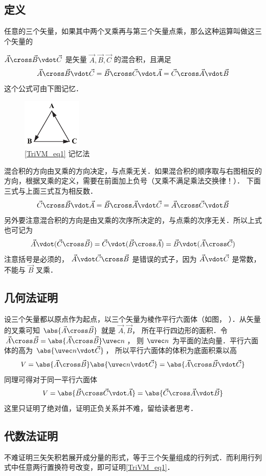 
\subsection{定义}

任意的三个矢量，如果其中两个叉乘再与第三个矢量点乘，那么这种运算叫做这三个矢量的

$\vec A \cross \vec B \vdot \vec C$ 是矢量 $\vec A, \vec B, \vec C$ 的混合积，且满足
\begin{equation}\label{TriVM_eq1}
\vec A \cross \vec B \vdot \vec C = \vec B \cross \vec C \vdot \vec A = \vec C \cross \vec A \vdot \vec B 
\end{equation} 
这个公式可由下图记忆．
\begin{figure}[ht]
\centering
\includegraphics[width=0.25\textwidth]{./figures/TriVM.pdf}
\caption{\autoref{TriVM_eq1} 记忆法}
\end{figure}
混合积的方向由叉乘的方向决定，与点乘无关．如果混合积的顺序取与右图相反的方向，根据叉乘的定义，需要在前面加上负号（叉乘不满足乘法交换律！）． 下面三式与上面三式互为相反数．
\begin{equation}
\vec C \cross \vec B \vdot \vec A = \vec B \cross \vec A \vdot \vec C = \vec A \cross \vec C \vdot \vec B
\end{equation} 
另外要注意混合积的方向是由叉乘的次序所决定的，与点乘的次序无关．所以上式也可记为
 \begin{equation}
\vec A \vdot (\vec C \cross \vec B) = \vec C \vdot (\vec B \cross \vec A) = \vec B \vdot (\vec A \cross \vec C)
\end{equation} 
注意括号是必须的， $\vec A \vdot \vec C \cross \vec B$ 是错误的式子，因为 $\vec A \vdot \vec C$ 是常数，不能与 $\vec B$ 叉乘．


\subsection{几何法证明}

设三个矢量都以原点作为起点，以三个矢量为棱作平行六面体（如图，%
）．从矢量的叉乘可知 $\abs{\vec A \cross \vec B}$ 就是 $\vec A,\vec B$，  所在平行四边形的面积．令 $\vec A \cross \vec B = \abs{\vec A \cross \vec B} \uvec n$， 则 $\uvec n$ 为平面的法向量．平行六面体的高为 $\abs{\uvec n \vdot \vec C}$， 所以平行六面体的体积为底面积乘以高
\begin{equation}
V = \abs{\vec A \cross \vec B} \abs{\uvec n \vdot \vec C} = \abs{\vec A \cross \vec B \vdot \vec C}
\end{equation}
同理可得对于同一平行六面体
\begin{equation}
V = \abs{\vec B \cross \vec C \vdot \vec A} = \abs{\vec C \cross \vec A \vdot \vec B} 
\end{equation}  
这里只证明了绝对值，证明正负关系并不难，留给读者思考．

\subsection{代数法证明}
不难证明三矢矢积若展开成分量的形式，等于三个矢量组成的行列式．而利用行列式中任意两行置换符号改变，即可证明\autoref{TriVM_eq1}．


